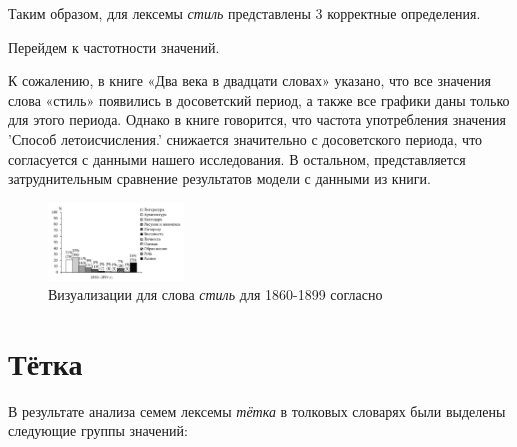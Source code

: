 Таким образом, для лексемы \textit{стиль} представлены 3 корректные определения.

Перейдем к частотности значений.

К сожалению, в книге «Два века в двадцати словах» указано,
что все значения слова «стиль» появились в досоветский период,
а также все графики даны только для этого периода.
Однако в книге говорится, что частота употребления значения ’Способ летоисчисления.’
снижается значительно с досоветского периода, что согласуется с данными нашего исследования.
В остальном, представляется затруднительным сравнение результатов модели с данными из книги.

\begin{figure}[H]
    \centering %
    \includegraphics[width=0.32\textwidth]{img/book/stil'/1860-1899}
    \caption{Визуализации для слова \textit{стиль} для 1860-1899 согласно~\cite{TwoCenturies}}
    \label{fig:Стиль}
\end{figure}

\section*{Тётка}

В результате анализа семем лексемы \textit{тётка} в толковых словарях были выделены следующие группы значений:

